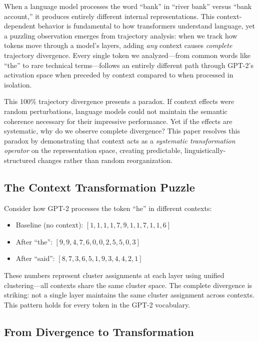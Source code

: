 \documentclass[11pt]{article}
\begin{document}
When a language model processes the word ``bank'' in ``river bank'' versus ``bank account,'' it produces entirely different internal representations. This context-dependent behavior is fundamental to how transformers understand language, yet a puzzling observation emerges from trajectory analysis: when we track how tokens move through a model's layers, adding \emph{any} context causes \emph{complete} trajectory divergence. Every single token we analyzed---from common words like ``the'' to rare technical terms---follows an entirely different path through GPT-2's activation space when preceded by context compared to when processed in isolation.

This 100\% trajectory divergence presents a paradox. If context effects were random perturbations, language models could not maintain the semantic coherence necessary for their impressive performance. Yet if the effects are systematic, why do we observe complete divergence? This paper resolves this paradox by demonstrating that context acts as a \emph{systematic transformation operator} on the representation space, creating predictable, linguistically-structured changes rather than random reorganization.

\subsection{The Context Transformation Puzzle}

Consider how GPT-2 processes the token ``he'' in different contexts:
\begin{itemize}
    \item Baseline (no context): $[1, 1, 1, 1, 7, 9, 1, 1, 7, 1, 1, 6]$
    \item After ``the'': $[9, 9, 4, 7, 6, 0, 0, 2, 5, 5, 0, 3]$
    \item After ``said'': $[8, 7, 3, 6, 5, 1, 9, 3, 4, 4, 2, 1]$
\end{itemize}

These numbers represent cluster assignments at each layer using unified clustering---all contexts share the same cluster space. The complete divergence is striking: not a single layer maintains the same cluster assignment across contexts. This pattern holds for every token in the GPT-2 vocabulary.

\subsection{From Divergence to Transformation}
\end{document}
